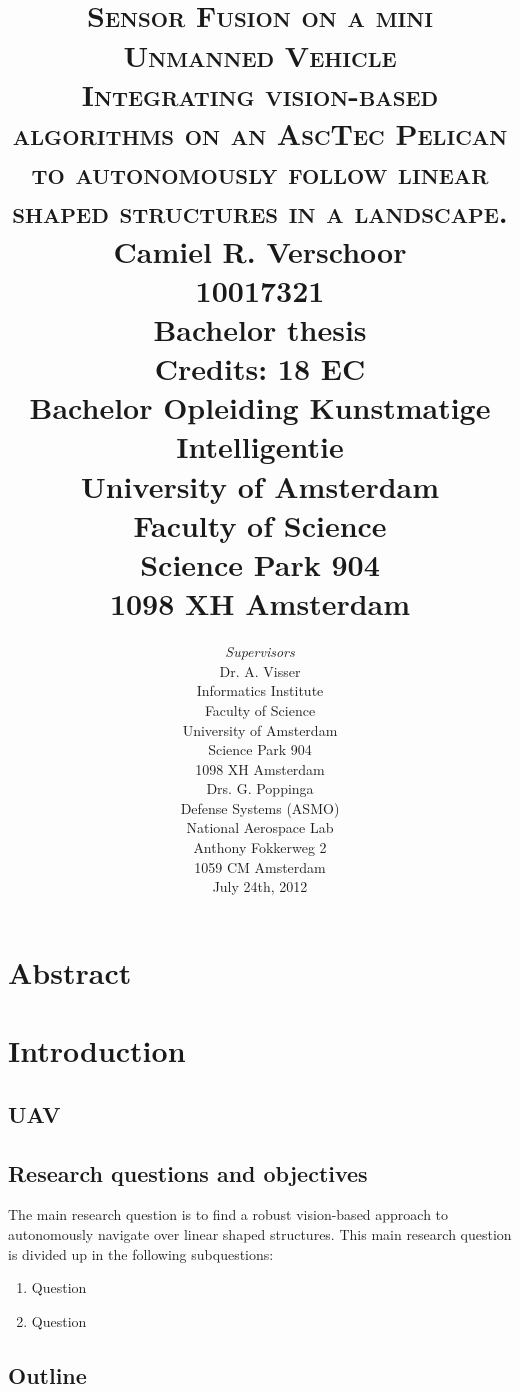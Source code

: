 \documentclass[a4paper,pdf]{article}
\title{
\HRule{0.5pt} \\
\LARGE \textbf{\textsc{Sensor Fusion on a mini Unmanned Vehicle}}\\[0.5cm]
\normalsize \textsc{Integrating vision-based algorithms on an AscTec Pelican to autonomously follow linear shaped structures in a landscape.}
\HRule{2pt}\\ [0.5cm]
Camiel R. Verschoor\\
10017321\\
\vspace{1cm}
Bachelor thesis\\
Credits: 18 EC\\
\vspace{0.5cm}
Bachelor Opleiding Kunstmatige Intelligentie\\
\vspace{0.25cm}
University of Amsterdam\\
Faculty of Science\\
Science Park 904\\
1098 XH Amsterdam\\
}
\author{\normalsize
\emph{Supervisors}\\
Dr. A. Visser\\
\vspace{0.25cm}
Informatics Institute\\
Faculty of Science\\
University of Amsterdam\\
Science Park 904\\
1098 XH  Amsterdam\\
\vspace{0.5cm}
Drs. G. Poppinga\\
\vspace{0.25cm}
Defense Systems (ASMO)\\
National Aerospace Lab\\
Anthony Fokkerweg 2\\
1059 CM Amsterdam\\
\vspace{1cm}
July 24th, 2012\\
}
\makeatletter
\def\printtitle{
    {\centering \@title\par}}
\def\printauthor{
    {\centering \large \@author}}
\makeatother
\begin{document}
\thispagestyle{empty}
\printtitle
\vfill          
\printauthor
\newpage

\section*{Abstract}
\newpage

\tableofcontents
\newpage

\section{Introduction}
\subsection{UAV}
\subsection{Research questions and objectives}
The main research question is to find a robust vision-based approach to autonomously navigate over linear shaped structures. This main research question is divided up in the following subquestions:
\begin{enumerate}
\item Question
\item Question
\end{enumerate}
\subsection{Outline}
\end{document}
